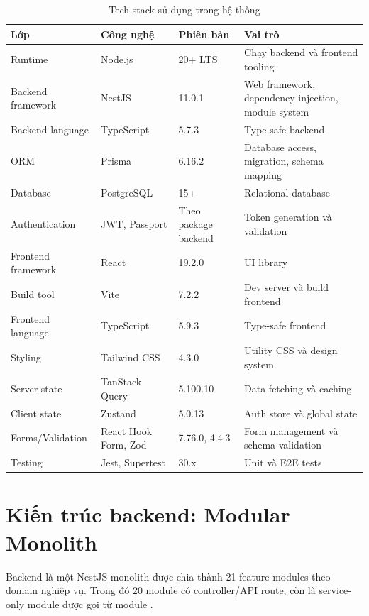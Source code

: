 \begin{longtable}{|p{3cm}|p{4cm}|p{3cm}|p{5cm}|}
\caption{Tech stack sử dụng trong hệ thống}\\
\hline
\textbf{Lớp} & \textbf{Công nghệ} & \textbf{Phiên bản} & \textbf{Vai trò} \\
\hline
Runtime & Node.js & 20+ LTS & Chạy backend và frontend tooling \\
\hline
Backend framework & NestJS & 11.0.1 & Web framework, dependency injection, module system \\
\hline
Backend language & TypeScript & 5.7.3 & Type-safe backend \\
\hline
ORM & Prisma & 6.16.2 & Database access, migration, schema mapping \\
\hline
Database & PostgreSQL & 15+ & Relational database \\
\hline
Authentication & JWT, Passport & Theo package backend & Token generation và validation \\
\hline
Frontend framework & React & 19.2.0 & UI library \\
\hline
Build tool & Vite & 7.2.2 & Dev server và build frontend \\
\hline
Frontend language & TypeScript & 5.9.3 & Type-safe frontend \\
\hline
Styling & Tailwind CSS & 4.3.0 & Utility CSS và design system \\
\hline
Server state & TanStack Query & 5.100.10 & Data fetching và caching \\
\hline
Client state & Zustand & 5.0.13 & Auth store và global state \\
\hline
Forms/Validation & React Hook Form, Zod & 7.76.0, 4.4.3 & Form management và schema validation \\
\hline
Testing & Jest, Supertest & 30.x & Unit và E2E tests \\
\hline
\end{longtable}

\section{Kiến trúc backend: Modular Monolith}

Backend là một NestJS monolith được chia thành 21 feature modules theo domain nghiệp vụ. Trong đó 20 module có controller/API route, còn  là service-only module được gọi từ module .


